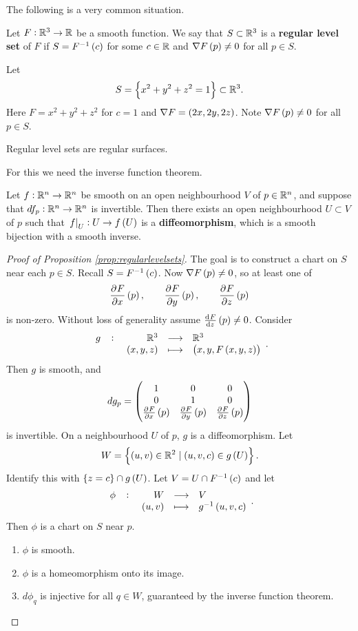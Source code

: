 
The following is a very common situation.

\begin{definition}
Let $ F : \mathbb{R}^3 \to \mathbb{R} $ be a smooth function. We say that $ S \subset \mathbb{R}^3 $ is a \textbf{regular level set} of $ F $ if $ S = F^{-1}\br{c} $ for some $ c \in \mathbb{R} $ and $ \nabla F\br{p} \ne 0 $ for all $ p \in S $.
\end{definition}

\begin{example*}
Let
$$ S = \cbr{x^2 + y^2 + z^2 = 1} \subset \R^3. $$
Here $ F = x^2 + y^2 + z^2 $ for $ c = 1 $ and $ \nabla F = \br{2x, 2y, 2z} $. Note $ \nabla F\br{p} \ne 0 $ for all $ p \in S $.
\end{example*}

\begin{proposition}
\label{prop:regularlevelsets}
Regular level sets are regular surfaces.
\end{proposition}

For this we need the inverse function theorem.

\begin{theorem}
Let $ f : \mathbb{R}^n \to \mathbb{R}^n $ be smooth on an open neighbourhood $ V $ of $ p \in \mathbb{R}^n $, and suppose that $ df_p : \mathbb{R}^n \to \mathbb{R}^n $ is invertible. Then there exists an open neighbourhood $ U \subset V $ of $ p $ such that $ \eval{f}_U : U \to f\br{U} $ is a \textbf{diffeomorphism}, which is a smooth bijection with a smooth inverse.
\end{theorem}

\begin{proof}[Proof of Proposition \ref{prop:regularlevelsets}]
The goal is to construct a chart on $ S $ near each $ p \in S $. Recall $ S = F^{-1}\br{c} $. Now $ \nabla F\br{p} \ne 0 $, so at least one of
$$ \dpd{F}{x}\br{p}, \qquad \dpd{F}{y}\br{p}, \qquad \dpd{F}{z}\br{p} $$
is non-zero. Without loss of generality assume $ \tod{F}{z}\br{p} \ne 0 $. Consider
$$ \function[g]{\R^3}{\R^3}{\br{x, y, z}}{\br{x, y, F\br{x, y, z}}}. $$
Then $ g $ is smooth, and
$$ dg_p = \threebythree{1}{0}{0}{0}{1}{0}{\tpd{F}{x}\br{p}}{\tpd{F}{y}\br{p}}{\tpd{F}{z}\br{p}} $$
is invertible. On a neighbourhood $ U $ of $ p $, $ g $ is a diffeomorphism. Let
$$ W = \cbr{\br{u, v} \in \R^2 \mid \br{u, v, c} \in g\br{U}}. $$
Identify this with $ \cbr{z = c} \cap g\br{U} $. Let $ V = U \cap F^{-1}\br{c} $ and let
$$ \function[\phi]{W}{V}{\br{u, v}}{g^{-1}\br{u, v, c}}. $$
Then $ \phi $ is a chart on $ S $ near $ p $.
\begin{enumerate}
\item $ \phi $ is smooth.
\item $ \phi $ is a homeomorphism onto its image.
\item $ d\phi_q $ is injective for all $ q \in W $, guaranteed by the inverse function theorem.
\end{enumerate}
\end{proof}

